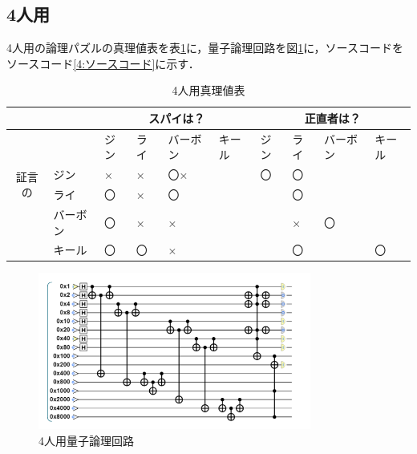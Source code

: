 \documentclass[titlepage,a4paper]{jsarticle}
\begin{document}
\subsection{4人用}
4人用の論理パズルの真理値表を表\ref{4:真理値}に，量子論理回路を図\ref{4:回路}に，ソースコードをソースコード\ref{4:ソースコード}に示す．
\begin{table}[H]
  \centering
  \caption{4人用真理値表}
  \label{4:真理値}
  \begin{tabular}{c|l|llll|llll}
    \multicolumn{1}{l}{} &      & \multicolumn{4}{c|}{スパイは？} & \multicolumn{4}{c}{正直者は？}                                     \\\hline
    \multicolumn{1}{l}{} &      & ジン                         & ライ                        & バーボン & キール & ジン & ライ & バーボン & キール \\\hline
    \multirow{2}{*}{証言の} & ジン   & ×                          & ×                         & 〇×   &     & 〇  & 〇  &      &     \\
    \multirow{2}{*}{正しさ} & ライ   & 〇                          & ×                         & 〇    &     &    & 〇  &      &     \\
                         & バーボン & 〇                          & ×                         & ×    &     &    & ×  & 〇    &     \\
                         & キール  & 〇                          & 〇                         & ×    &     &    & 〇  &      & 〇   \\\hline
  \end{tabular}
\end{table}

\begin{figure}[H]
  \centering
  \includegraphics[width=0.8\textwidth]{img/4_qc.png}
  \caption{4人用量子論理回路}
  \label{4:回路}
\end{figure}
\end{document}
